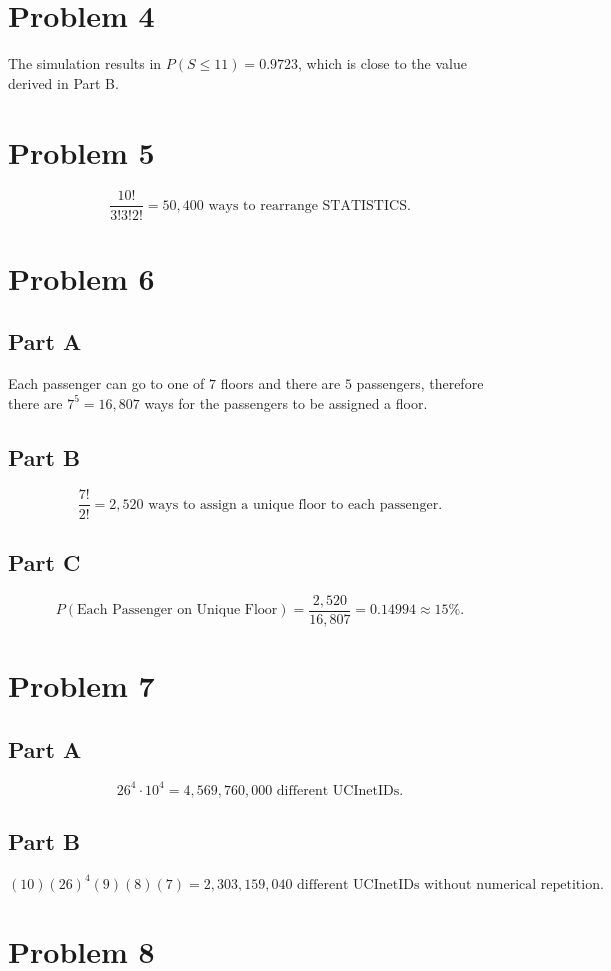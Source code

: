 \documentclass[12pt]{extarticle}
\begin{document}
\section*{Problem 4}
The simulation results in $P(S \leq 11) = 0.9723$, which is close to the value derived in Part B.

\section*{Problem 5}
\[
	\frac{10!}{3! 3! 2!} = 50,400 \text{ ways to rearrange STATISTICS}
.\]

\section*{Problem 6}
\subsection*{Part A}
Each passenger can go to one of $7$ floors and there are $5$ passengers, therefore there are $7^5 = 16,807$ ways for the passengers to be assigned a floor.

\subsection*{Part B}
\[
	\frac{7!}{2!} = 2,520 \text{ ways to assign a unique floor to each passenger}
.\]

\subsection*{Part C}
\[
	P(\text{Each Passenger on Unique Floor}) = \frac{2,520}{16,807} = 0.14994 \approx 15\%
.\]

\section*{Problem 7}
\subsection*{Part A}
\[
	26^4 \cdot 10^4 = 4,569,760,000 \text{ different UCInetIDs}
.\]

\subsection*{Part B}
\[
	(10)(26)^4(9)(8)(7) = 2,303,159,040 \text{ different UCInetIDs without numerical repetition}
.\]

\section*{Problem 8}
\end{document}
